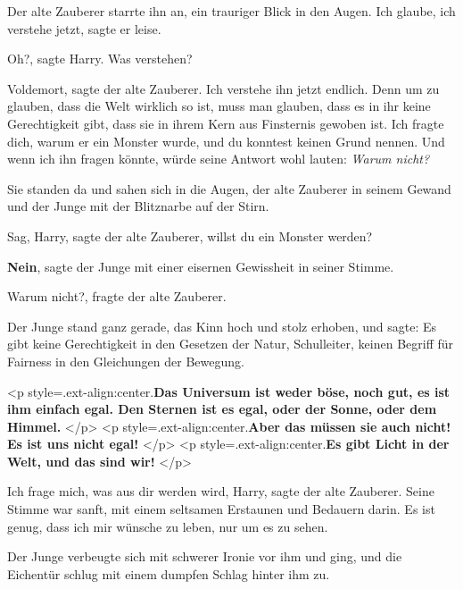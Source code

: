 Der alte Zauberer starrte ihn an, ein trauriger Blick in den Augen. \glqq Ich
glaube, ich verstehe jetzt\grqq{}, sagte er leise.

\glqq Oh?\grqq{}, sagte Harry. \glqq Was verstehen?\grqq{}

\glqq Voldemort\grqq{}, sagte der alte Zauberer. \glqq Ich verstehe ihn jetzt
endlich. Denn um zu glauben, dass die Welt wirklich so ist, muss man glauben,
dass es in ihr keine Gerechtigkeit gibt, dass sie in ihrem Kern aus Finsternis
gewoben ist. Ich fragte dich, warum er ein Monster wurde, und du konntest keinen
Grund nennen. Und wenn ich ihn fragen könnte, würde seine Antwort wohl lauten:
\emph{Warum nicht?}\grqq{}

Sie standen da und sahen sich in die Augen, der alte Zauberer in seinem Gewand
und der Junge mit der Blitznarbe auf der Stirn.

\glqq Sag, Harry\grqq{}, sagte der alte Zauberer, \glqq willst du ein Monster
werden?\grqq{}

\glqq \textbf{Nein}\grqq{}, sagte der Junge mit einer eisernen Gewissheit in
seiner Stimme.

\glqq Warum nicht?\grqq{}, fragte der alte Zauberer.

Der Junge stand ganz gerade, das Kinn hoch und stolz erhoben, und sagte: \glqq
Es gibt keine Gerechtigkeit in den Gesetzen der Natur, Schulleiter, keinen
Begriff für Fairness in den Gleichungen der Bewegung.

<p style=\grqq{}.ext-align:center\grqq{}.\textbf{Das Universum ist weder böse,
noch gut, es ist ihm einfach egal. Den Sternen ist es egal, oder der Sonne, oder
dem Himmel. }</p> <p style=\grqq{}.ext-align:center\grqq{}.\textbf{Aber das
müssen sie auch nicht! Es ist uns nicht egal! }</p> <p
style=\grqq{}.ext-align:center\grqq{}.\textbf{Es gibt Licht in der Welt, und das
sind wir!}\grqq{} </p>

\glqq Ich frage mich, was aus dir werden wird, Harry\grqq{}, sagte der alte
Zauberer. Seine Stimme war sanft, mit einem seltsamen Erstaunen und Bedauern
darin. \glqq Es ist genug, dass ich mir wünsche zu leben, nur um es zu
sehen.\grqq{}

Der Junge verbeugte sich mit schwerer Ironie vor ihm und ging, und die Eichentür
schlug mit einem dumpfen Schlag hinter ihm zu.

